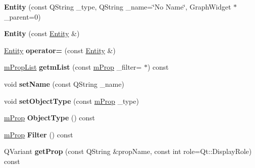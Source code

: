 \begin{DoxyCompactItemize}
\item 
\mbox{\label{class_entity_aa0fffe44a5056743ae2e481447f5beca}} 
{\bfseries Entity} (const Q\+String \+\_\+type, Q\+String \+\_\+name=\char`\"{}No Name\char`\"{}, Graph\+Widget $\ast$\+\_\+parent=0)
\item 
\mbox{\label{class_entity_a976383e67d648de0e4e5955bad695147}} 
{\bfseries Entity} (const \hyperlink{class_entity}{Entity} \&)
\item 
\mbox{\label{class_entity_a231b0dc6f5f7ae7332eb8c85d38ec337}} 
\hyperlink{class_entity}{Entity} {\bfseries operator=} (const \hyperlink{class_entity}{Entity} \&)
\item 
\mbox{\label{class_entity_a3b81a93ac16f346edaae537705fa6b5a}} 
\hyperlink{classm_prop_list}{m\+Prop\+List} {\bfseries getm\+List} (const \hyperlink{classm_prop}{m\+Prop} \+\_\+filter=\textquotesingle{} $\ast$\textquotesingle{}) const
\item 
\mbox{\label{class_entity_ae48e68feec6502b673e298f55c6bf632}} 
void {\bfseries set\+Name} (const Q\+String \+\_\+name)
\item 
\mbox{\label{class_entity_a71a075226cb2c9531f75a0a451b67f24}} 
void {\bfseries set\+Object\+Type} (const \hyperlink{classm_prop}{m\+Prop} \+\_\+type)
\item 
\mbox{\label{class_entity_a1825e3a69a38facafeb21d522fae20a2}} 
\hyperlink{classm_prop}{m\+Prop} {\bfseries Object\+Type} () const
\item 
\mbox{\label{class_entity_a76a436f97fa481feb4da1c0c8a8b5ea6}} 
\hyperlink{classm_prop}{m\+Prop} {\bfseries Filter} () const
\item 
\mbox{\label{class_entity_afcc5680f1d4756239c8b9053e87fc36f}} 
Q\+Variant {\bfseries get\+Prop} (const Q\+String \&prop\+Name, const int role=Qt\+::\+Display\+Role) const
\item 
\mbox{\label{class_entity_a6ba89e7d82d0309078b7479cfe5f5e29}} 

\end{DoxyCompactItemize}
